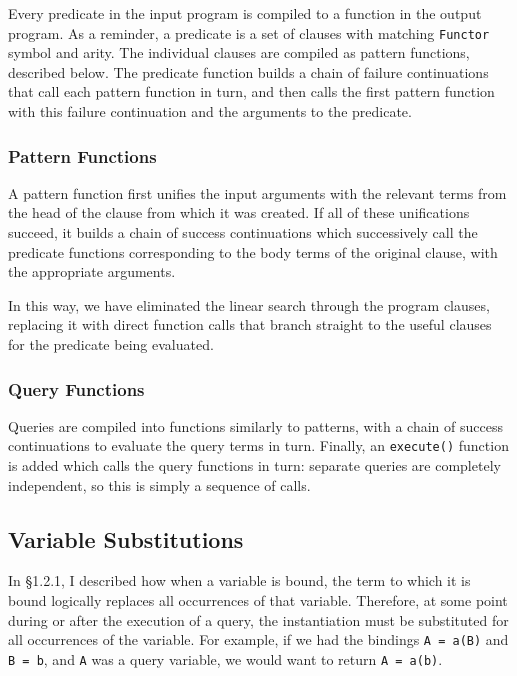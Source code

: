\documentclass[12pt]{article}
\begin{document}
Every predicate in the input program is compiled to a function in the output program. 
As a reminder, a predicate is a set of clauses with matching \verb|Functor| symbol and arity. 
The individual clauses are compiled as pattern functions, described below. 
The predicate function builds a chain of failure continuations that call each pattern function in turn, and then calls the first pattern function with this failure continuation and the arguments to the predicate.

\subsubsection{Pattern Functions}

A pattern function first unifies the input arguments with the relevant terms from the head of the clause from which it was created.
If all of these unifications succeed, it builds a chain of success continuations which successively call the predicate functions corresponding to the body terms of the original clause, with the appropriate arguments.

In this way, we have eliminated the linear search through the program clauses, replacing it with direct function calls that branch straight to the useful clauses for the predicate being evaluated.


\subsubsection{Query Functions}

Queries are compiled into functions similarly to patterns, with a chain of success continuations to evaluate the query terms in turn. 
Finally, an \verb|execute()| function is added which calls the query functions in turn: separate queries are completely independent, so this is simply a sequence of calls.

\subsection{Variable Substitutions}

In \S1.2.1, I described how when a variable is bound, the term to which it is bound logically replaces all occurrences of that variable. 
Therefore, at some point during or after the execution of a query, the instantiation must be substituted for all occurrences of the variable. 
For example, if we had the bindings \verb|A = a(B)| and \verb|B = b|, and \verb|A| was a query variable, we would want to return \verb|A = a(b)|.
\end{document}
